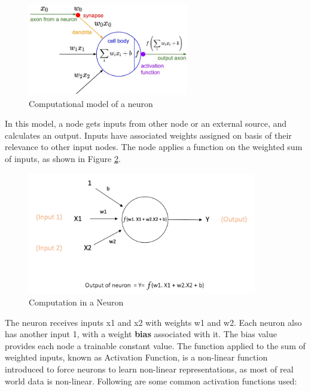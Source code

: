 \begin{figure}[h!]
\centering
\includegraphics[width=7cm]{figures/Neuron_Model.jpg}
\caption{Computational model of a neuron \cite{nn_stanford_1}}
\label{fig:cnn2}
\end{figure}

In this model, a node gets inputs from other node or an external source, and calculates an output. Inputs have associated weights assigned on basis of their relevance to other input nodes. The node applies a function on the weighted sum of inputs, as shown in Figure \ref{fig:cnn3}.
\begin{figure}[h!]
\centering
\includegraphics[width=10cm]{figures/Input_and_Output_to_a_Node.png}
\caption{Computation in a Neuron\cite{nn_karn}}
\label{fig:cnn3}
\end{figure}

The neuron receives inputs x1 and x2 with weights w1 and w2. Each neuron also has another input 1, with a weight \textbf{bias} associated with it. The bias value provides each node a trainable constant value.\newline\newline 
The function applied to the sum of weighted inputs, known as Activation Function, is a non-linear function introduced to force neurons to learn non-linear representations, as most of real world data is non-linear. Following are some common activation functions used:

